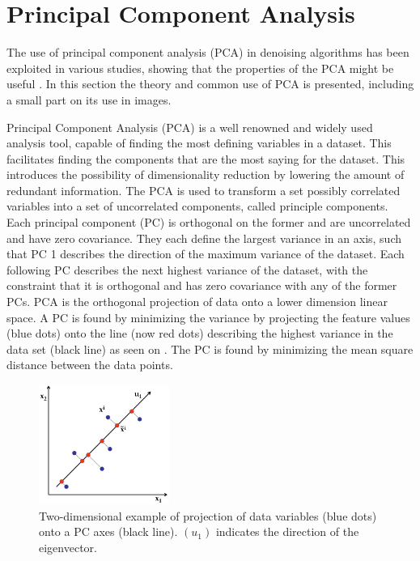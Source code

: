 
\section{Principal Component Analysis} \label{sec:PCA}

The use of principal component analysis (PCA) in denoising algorithms has been exploited in various studies, showing that the properties of the PCA might be useful \cite{Behzadi2013}. In this section the theory and common use of PCA is presented, including a small part on its use in images. 

Principal Component Analysis (PCA) is a well renowned and widely used analysis tool, capable of finding the most defining variables in a dataset. This facilitates finding the components that are the most saying for the dataset. This introduces the possibility of dimensionality reduction by lowering the amount of redundant information. The PCA is used to transform a set possibly correlated variables into a set of uncorrelated components, called principle components. Each principal component (PC) is
orthogonal on the former and are uncorrelated and have zero covariance. They each define the largest
variance in an axis, such that PC 1 describes the direction of the maximum variance of the dataset. Each
following PC describes the next highest variance of the dataset, with the constraint that it is orthogonal
and has zero covariance with any of the former PCs. PCA is the orthogonal projection of data onto a
lower dimension linear space.  A PC is found by minimizing the variance by projecting the feature values (blue dots) onto the line (now red dots) describing the highest variance in the data set (black line) as seen on . The PC is found by minimizing the mean square distance between the data points. \cite{Semmlow2004}

\begin{figure}[H] 
	\includegraphics[width=0.38\textwidth]{figures/aBackground/projection}
	\caption{Two-dimensional example of projection of data variables (blue dots) onto a PC axes (black line). $(u_1)$ indicates the direction of the eigenvector. \cite{PCA2018}}
	\label{projection}
\end{figure}

